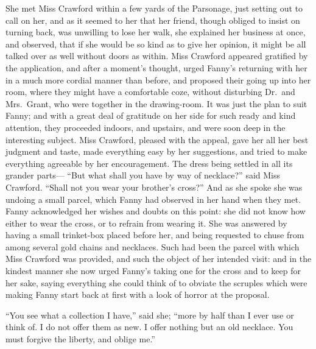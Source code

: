 \documentclass{article}
\begin{document}
She met Miss Crawford within a few yards of the Parsonage,
just setting out to call on her, and as it seemed to her
that her friend, though obliged to insist on turning back,
was unwilling to lose her walk, she explained her business
at once, and observed, that if she would be so kind
as to give her opinion, it might be all talked over as
well without doors as within.  Miss Crawford appeared
gratified by the application, and after a moment's thought,
urged Fanny's returning with her in a much more cordial
manner than before, and proposed their going up into
her room, where they might have a comfortable coze,
without disturbing Dr.\ and Mrs.\ Grant, who were together
in the drawing-room. It was just the plan to suit Fanny;
and with a great deal of gratitude on her side for such ready
and kind attention, they proceeded indoors, and upstairs,
and were soon deep in the interesting subject.  Miss Crawford,
pleased with the appeal, gave her all her best judgment
and taste, made everything easy by her suggestions,
and tried to make everything agreeable by her encouragement.
The dress being settled in all its grander parts---%
``But what shall you have by way of necklace?'' said Miss
Crawford.  ``Shall not you wear your brother's cross?''
And as she spoke she was undoing a small parcel,
which Fanny had observed in her hand when they met.
Fanny acknowledged her wishes and doubts on this point:
she did not know how either to wear the cross, or to
refrain from wearing it.  She was answered by having
a small trinket-box placed before her, and being requested
to chuse from among several gold chains and necklaces.
Such had been the parcel with which Miss Crawford
was provided, and such the object of her intended visit:
and in the kindest manner she now urged Fanny's taking one
for the cross and to keep for her sake, saying everything
she could think of to obviate the scruples which were
making Fanny start back at first with a look of horror at
the proposal.

``You see what a collection I have,'' said she; ``more by half
than I ever use or think of.  I do not offer them as new.
I offer nothing but an old necklace.  You must forgive
the liberty, and oblige me.''
\end{document}
